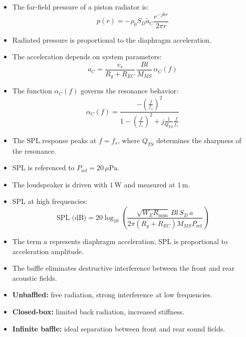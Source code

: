 \begin{tcolorbox}[colback=gray!10!white,colframe=black,title=\textbf{Summary – Loudspeaker SPL and Far-field Pressure}]
\begin{itemize}
    \item The far-field pressure of a piston radiator is:
    \[
    p(r) = - \rho_0 S_D \tilde{a}_C \frac{e^{-jkr}}{2 \pi r}
    \]
    \item Radiated pressure is proportional to the diaphragm acceleration.
    \item The acceleration depends on system parameters:
    \[
    a_C = \frac{v_s}{R_g + R_{EC}} \, \frac{B l}{M_{MS}} \, \alpha_C(f)
    \]
    \item The function \( \alpha_C(f) \) governs the resonance behavior:
    \[
    \alpha_C(f) = \frac{- \left( \frac{f}{f_s} \right)^2}{1 - \left( \frac{f}{f_s} \right)^2 + j \frac{1}{Q_{TS}} \frac{f}{f_s}}
    \]
    \item The SPL response peaks at \( f = f_s \), where \( Q_{TS} \) determines the sharpness of the resonance.
\end{itemize}
\end{tcolorbox}


\begin{tcolorbox}[colback=gray!10!white,colframe=black,title=\textbf{Summary – SPL Expression}]
\begin{itemize}
    \item SPL is referenced to \( P_{\text{ref}} = 20\,\mu\text{Pa} \).
    \item The loudspeaker is driven with \( 1\,\text{W} \) and measured at \( 1\,\text{m} \).
    \item SPL at high frequencies:
    \[
    \text{SPL (dB)} = 20 \log_{10} \left( \frac{\sqrt{W_E R_{\text{nom}}} \, B l \, S_D \, a}{2\pi (R_g + R_{EC}) M_{MS} P_{\text{ref}}} \right)
    \]
    \item The term \( a \) represents diaphragm acceleration; SPL is proportional to acceleration amplitude.
\end{itemize}
\end{tcolorbox}

\begin{tcolorbox}[colback=gray!10!white,colframe=black,title=\textbf{Summary – Loudspeaker Baffle Systems}]
\begin{itemize}
    \item The baffle eliminates destructive interference between the front and rear acoustic fields.
    \item \textbf{Unbaffled:} free radiation, strong interference at low frequencies.
    \item \textbf{Closed-box:} limited back radiation, increased stiffness.
    \item \textbf{Infinite baffle:} ideal separation between front and rear sound fields.
\end{itemize}
\end{tcolorbox}



